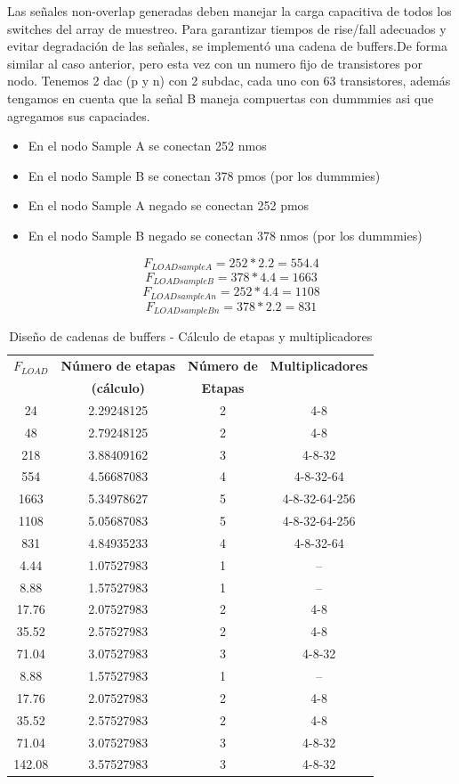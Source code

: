 \documentclass[12pt,a4paper]{report}
\begin{document}
Las señales non-overlap generadas deben manejar la carga capacitiva de todos los switches del array de muestreo. Para garantizar tiempos de rise/fall adecuados y evitar degradación de las señales, se implementó una cadena de buffers.De forma similar al caso anterior, pero esta vez con un numero fijo de transistores por nodo. Tenemos 2 dac (p y n) con 2 subdac, cada uno con 63 transistores, además tengamos en cuenta que la señal B maneja compuertas con dummmies asi que agregamos sus capaciades.
\begin{itemize}
    \item En el nodo Sample A se conectan 252 nmos
    \item En el nodo Sample B se conectan 378 pmos (por los dummmies)
    \item En el nodo Sample A negado se conectan 252 pmos
    \item En el nodo Sample B negado se conectan 378 nmos (por los dummmies)
\end{itemize}

$$F_{LOAD sample A} = 252*2.2=554.4$$
$$F_{LOAD sample B} = 378*4.4=1663$$
$$F_{LOAD sample A n} = 252*4.4=1108$$
$$F_{LOAD sample B n} = 378*2.2=831$$


\begin{table}[h]
\centering
\caption{Diseño de cadenas de buffers - Cálculo de etapas y multiplicadores}
\label{tab:buffer_chain_detailed}
\begin{tabular}{cccc}
\toprule
\textbf{$F_{LOAD}$} & \textbf{Número de etapas} & \textbf{Número de} & \textbf{Multiplicadores} \\
 & \textbf{(cálculo)} & \textbf{Etapas} & \\
\midrule
24 & 2.29248125 & 2 & 4-8 \\
48 & 2.79248125 & 2 & 4-8 \\
218 & 3.88409162 & 3 & 4-8-32 \\
554 & 4.56687083 & 4 & 4-8-32-64 \\
1663 & 5.34978627 & 5 & 4-8-32-64-256 \\
1108 & 5.05687083 & 5 & 4-8-32-64-256 \\
831 & 4.84935233 & 4 & 4-8-32-64 \\
4.44 & 1.07527983 & 1 & -- \\
8.88 & 1.57527983 & 1 & -- \\
17.76 & 2.07527983 & 2 & 4-8 \\
35.52 & 2.57527983 & 2 & 4-8 \\
71.04 & 3.07527983 & 3 & 4-8-32 \\
8.88 & 1.57527983 & 1 & -- \\
17.76 & 2.07527983 & 2 & 4-8 \\
35.52 & 2.57527983 & 2 & 4-8 \\
71.04 & 3.07527983 & 3 & 4-8-32 \\
142.08 & 3.57527983 & 3 & 4-8-32 \\
\bottomrule
\end{tabular}
\end{table}
\newpage
\end{document}
